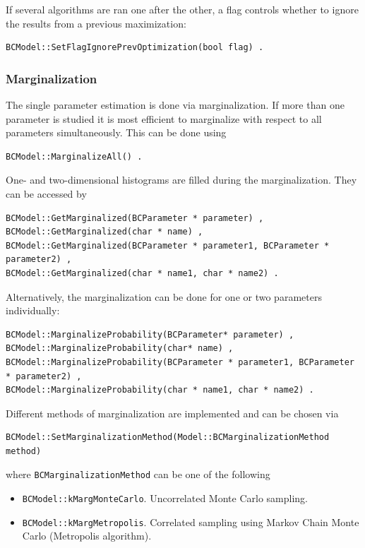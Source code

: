 \documentclass[11pt, a4paper]{article}
\begin{document}
\noindent
If several algorithms are ran one after the other, a flag controls
whether to ignore the results from a previous maximization:
%
\begin{verbatim}
BCModel::SetFlagIgnorePrevOptimization(bool flag) .
\end{verbatim}


\subsubsection{Marginalization}
\label{subsubsection:marginalization}

\noindent
The single parameter estimation is done via marginalization. If more
than one parameter is studied it is most efficient to marginalize with
respect to all parameters simultaneously. This can be done using
%
\begin{verbatim}
BCModel::MarginalizeAll() .
\end{verbatim}

\noindent
One- and two-dimensional histograms are filled during the
marginalization. They can be accessed by
%
\begin{verbatim}
BCModel::GetMarginalized(BCParameter * parameter) ,
BCModel::GetMarginalized(char * name) ,
BCModel::GetMarginalized(BCParameter * parameter1, BCParameter * parameter2) ,
BCModel::GetMarginalized(char * name1, char * name2) .
\end{verbatim}

\noindent
Alternatively, the marginalization can be done for one or two
parameters individually:
%
\begin{verbatim}
BCModel::MarginalizeProbability(BCParameter* parameter) ,
BCModel::MarginalizeProbability(char* name) ,
BCModel::MarginalizeProbability(BCParameter * parameter1, BCParameter * parameter2) ,
BCModel::MarginalizeProbability(char * name1, char * name2) .
\end{verbatim}

\noindent
Different methods of marginalization are implemented and can be chosen
via
%
\begin{verbatim}
BCModel::SetMarginalizationMethod(Model::BCMarginalizationMethod method)
\end{verbatim}

\noindent
where \verb|BCMarginalizationMethod| can be one of the following
%
\begin{itemize}
\item \verb|BCModel::kMargMonteCarlo|. Uncorrelated Monte Carlo sampling.
\item \verb|BCModel::kMargMetropolis|. Correlated sampling using
  Markov Chain Monte Carlo (Metropolis algorithm).
\end{itemize}
\end{document}

